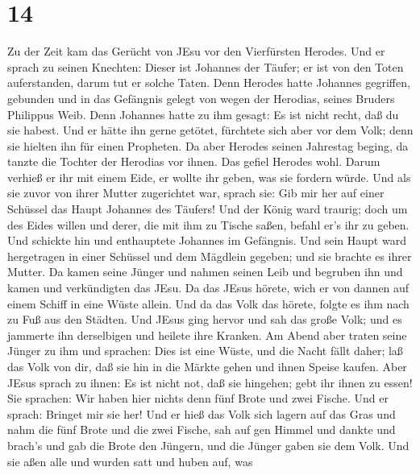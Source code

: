 \hypertarget{section-13}{%
\section{14}\label{section-13}}

 Zu der Zeit kam das Gerücht von JEsu vor den Vierfürsten
Herodes.  Und er sprach zu seinen Knechten: Dieser ist
Johannes der Täufer; er ist von den Toten auferstanden, darum tut er
solche Taten.  Denn Herodes hatte Johannes gegriffen,
gebunden und in das Gefängnis gelegt von wegen der Herodias, seines
Bruders Philippus Weib.  Denn Johannes hatte zu ihm gesagt:
Es ist nicht recht, daß du sie habest.  Und er hätte ihn
gerne getötet, fürchtete sich aber vor dem Volk; denn sie hielten ihn
für einen Propheten.  Da aber Herodes seinen Jahrestag
beging, da tanzte die Tochter der Herodias vor ihnen. Das gefiel Herodes
wohl.  Darum verhieß er ihr mit einem Eide, er wollte ihr
geben, was sie fordern würde.  Und als sie zuvor von ihrer
Mutter zugerichtet war, sprach sie: Gib mir her auf einer Schüssel das
Haupt Johannes des Täufers!  Und der König ward traurig;
doch um des Eides willen und derer, die mit ihm zu Tische saßen, befahl
er's ihr zu geben.  Und schickte hin und enthauptete
Johannes im Gefängnis.  Und sein Haupt ward hergetragen in
einer Schüssel und dem Mägdlein gegeben; und sie brachte es ihrer
Mutter.  Da kamen seine Jünger und nahmen seinen Leib und
begruben ihn und kamen und verkündigten das JEsu.  Da das
JEsus hörete, wich er von dannen auf einem Schiff in eine Wüste allein.
Und da das Volk das hörete, folgte es ihm nach zu Fuß aus den Städten.
 Und JEsus ging hervor und sah das große Volk; und es
jammerte ihn derselbigen und heilete ihre Kranken.  Am
Abend aber traten seine Jünger zu ihm und sprachen: Dies ist eine Wüste,
und die Nacht fällt daher; laß das Volk von dir, daß sie hin in die
Märkte gehen und ihnen Speise kaufen.  Aber JEsus sprach zu
ihnen: Es ist nicht not, daß sie hingehen; gebt ihr ihnen zu essen!
 Sie sprachen: Wir haben hier nichts denn fünf Brote und
zwei Fische.  Und er sprach: Bringet mir sie her!
 Und er hieß das Volk sich lagern auf das Gras und nahm die
fünf Brote und die zwei Fische, sah auf gen Himmel und dankte und
brach's und gab die Brote den Jüngern, und die Jünger gaben sie dem
Volk.  Und sie aßen alle und wurden satt und huben auf, was
